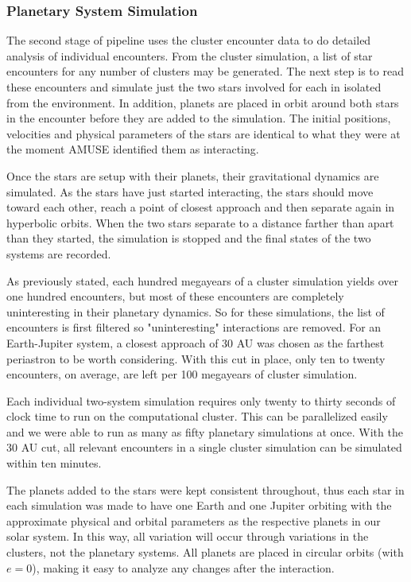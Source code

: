 \documentclass[12pt]{article}
\begin{document}
    \subsubsection{Planetary System Simulation}

    The second stage of pipeline uses the cluster encounter data to do
    detailed analysis of individual encounters.
    From the cluster simulation, a list of star encounters for any number of 
    clusters may be generated. The next step is to read these encounters and
    simulate just the two stars involved for each in isolated from the 
    environment. In addition, planets are placed in orbit around both stars in the
    encounter before they are added to the simulation. The initial positions,
    velocities and physical parameters of the stars are identical to what they
    were at the moment AMUSE identified them as interacting. 

    Once the stars are setup with their planets, their gravitational dynamics
    are simulated. As the stars have just started interacting, the stars should
    move toward each other, reach a point of closest approach and then separate again
    in hyperbolic orbits. When the two stars separate to a distance farther than
    apart than they started, the simulation is stopped and the final states of the two
    systems are recorded. 

    As previously stated, each hundred megayears of a cluster simulation yields over
    one hundred encounters, but most of these encounters are completely uninteresting
    in their planetary dynamics. So for these simulations, the list of encounters is 
    first filtered so "uninteresting" interactions are removed. For an Earth-Jupiter
    system, a closest approach of 30 AU was chosen as the farthest periastron to be
    worth considering. With this cut in place, only ten to twenty encounters, on
    average, are left per 100 megayears of cluster simulation.


    Each individual two-system simulation requires only twenty to thirty
    seconds of clock time to run on the computational cluster. This can be
    parallelized easily and we were able to run as many as fifty
    planetary simulations at once. With the 30 AU cut, all relevant encounters 
    in a single cluster simulation can be simulated within ten minutes.

    The planets added to the stars were kept consistent throughout, thus 
    each star in each simulation was made to have one Earth and one Jupiter
    orbiting with the approximate physical and orbital
    parameters as the respective planets in our solar system. 
    In this way, all variation will occur through variations in the clusters, not
    the planetary systems.
    All planets are
    placed in circular orbits (with $e=0$), making it easy to analyze
    any changes after the interaction.
\end{document}

